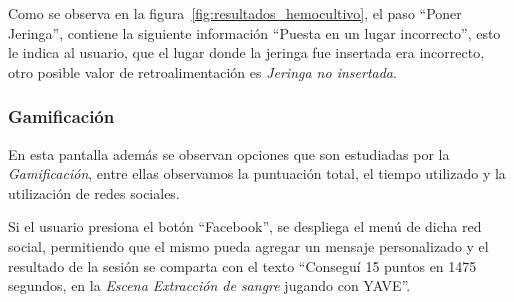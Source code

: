 Como se observa en la figura~\ref{fig:resultados_hemocultivo}, el paso
\enquote{Poner Jeringa}, contiene la siguiente información \enquote{Puesta en un
    lugar incorrecto}, esto le indica al usuario, que el lugar donde la jeringa
fue insertada era incorrecto, otro posible valor de retroalimentación es
\emph{Jeringa no insertada}.

\subsubsection{Gamificación}

En esta pantalla además se observan opciones que son estudiadas por la
\emph{Gamificación}, entre ellas observamos la puntuación total, el tiempo
utilizado y la utilización de redes sociales.

Si el usuario presiona el botón \enquote{Facebook}, se despliega el menú de
dicha red social, permitiendo que el mismo pueda agregar un mensaje
personalizado y el resultado de la sesión se comparta con el texto \enquote{Conseguí 15 puntos
    en 1475 segundos, en la \emph{Escena Extracción de sangre} jugando con
    YAVE}.


